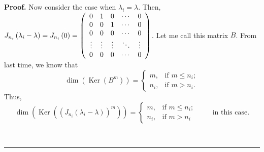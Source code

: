 \documentclass[numbers=enddot,12pt,final,onecolumn,notitlepage]{scrartcl}%
\numberwithin{exer}{subsection}
\theoremstyle{definition}
\newenvironment{proof}[1][Proof]{\noindent\textbf{#1.} }{\ \rule{0.5em}{0.5em}}
\begin{document}
\begin{proof}
Now consider the case when $\lambda_{i}=\lambda$. Then, $J_{n_{i}}\left(
\lambda_{i}-\lambda\right)  =J_{n_{i}}\left(  0\right)  =\left(
\begin{array}
[c]{ccccc}%
0 & 1 & 0 & \cdots & 0\\
0 & 0 & 1 & \cdots & 0\\
0 & 0 & 0 & \cdots & 0\\
\vdots & \vdots & \vdots & \ddots & \vdots\\
0 & 0 & 0 & \cdots & 0
\end{array}
\right)  $. Let me call this matrix $B$. From last time, we know that
\[
\dim\left(  \operatorname*{Ker}\left(  B^{m}\right)  \right)  =%
\begin{cases}
m, & \text{if }m\leq n_{i};\\
n_{i}, & \text{if }m>n_{i}.
\end{cases}
\]
Thus,%
\[
\dim\left(  \operatorname*{Ker}\left(  \left(  J_{n_{i}}\left(  \lambda
_{i}-\lambda\right)  \right)  ^{m}\right)  \right)  =%
\begin{cases}
m, & \text{if }m\leq n_{i};\\
n_{i}, & \text{if }m>n_{i}%
\end{cases}
\ \ \ \ \ \ \ \ \ \ \text{in this case.}%
\]



\end{proof}
\end{document}
